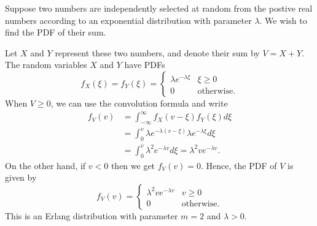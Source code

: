 \begin{example}
Suppose two numbers are independently selected at random from the postive real numbers according to an exponential distribution with parameter $\lambda$. 
We wish to find the PDF of their sum.

Let $X$ and $Y$ represent these two numbers, and denote their sum by $V = X + Y$.
The random variables $X$ and $Y$ have PDFs
\begin{equation*}
f_X (\xi) = f_Y (\xi) = \begin{cases} \lambda e^{-\lambda \xi} & \xi \geq 0 \\
0 & \text{otherwise} . \end{cases}
\end{equation*}
When $V \geq 0$, we can use the convolution formula and write
\begin{equation*}
\begin{split}
f_V (v) &= \int_{-\infty}^{\infty} f_X(v - \xi) f_Y(\xi) d\xi \\
&= \int_0^v \lambda e^{-\lambda(v - \xi)} \lambda e^{-\lambda \xi} d\xi \\
&= \int_0^v \lambda^2 e^{-\lambda v} d\xi
= \lambda^2 v e^{-\lambda v}.
\end{split}
\end{equation*}
On the other hand, if $v < 0$ then we get $f_V(v) = 0$.
Hence, the PDF of $V$ is given by
\begin{equation*}
f_V (v) = \begin{cases} \lambda^2 v e^{-\lambda v} & v \geq 0 \\
0 & \text{otherwise} . \end{cases}
\end{equation*}
This is an Erlang distribution with parameter $m = 2$ and $\lambda > 0$.
\end{example}

